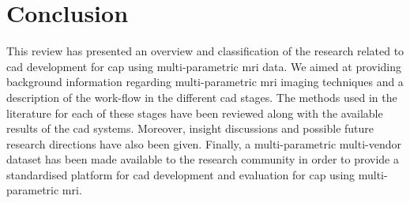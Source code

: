 \section{Conclusion} \label{sec:conclusion}

This review has presented an overview and classification of the research related to \ac{cad} development for \ac{cap} using multi-parametric \ac{mri} data. We aimed at providing background information regarding multi-parametric \ac{mri} imaging techniques and a description of the work-flow in the different \ac{cad} stages. The methods used in the literature for each of these stages have been reviewed along with the available results of the \ac{cad} systems. Moreover, insight discussions and possible future research directions have also been given. Finally, a multi-parametric multi-vendor dataset has been made available to the research community in order to provide a standardised platform for \ac{cad} development and evaluation for \ac{cap} using multi-parametric \ac{mri}.

